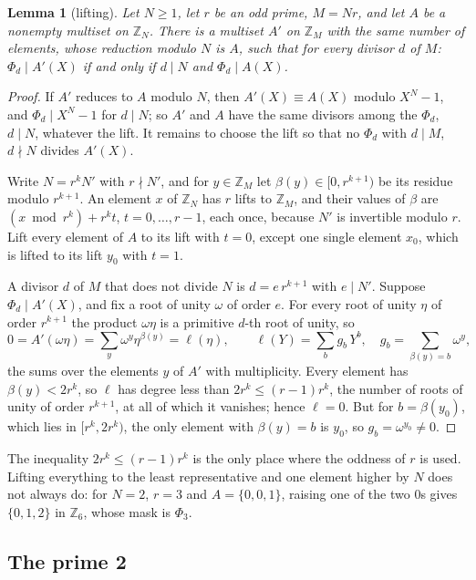 \documentclass[11pt,a4paper]{amsart}
\newtheorem{lemma}[theorem]{Lemma}
\theoremstyle{definition}
\theoremstyle{remark}
\newcommand{\Z}{\mathbb{Z}}
\begin{document}
\begin{lemma}[lifting]\label{lem:lift}
Let $N\ge1$, let $r$ be an odd prime, $M=Nr$, and let $A$ be a nonempty multiset on $\Z_N$. There is a
multiset $A'$ on $\Z_M$ with the same number of elements, whose reduction modulo $N$ is $A$, such that for
every divisor $d$ of $M$: $\Phi_d\mid A'(X)$ if and only if $d\mid N$ and $\Phi_d\mid A(X)$.
\end{lemma}
\begin{proof}
If $A'$ reduces to $A$ modulo $N$, then $A'(X)\equiv A(X)$ modulo $X^N-1$, and $\Phi_d\mid X^N-1$ for $d\mid N$; so
$A'$ and $A$ have the same divisors among the $\Phi_d$, $d\mid N$, whatever the lift. It remains to choose the
lift so that no $\Phi_d$ with $d\mid M$, $d\nmid N$ divides $A'(X)$.

Write $N=r^kN'$ with $r\nmid N'$, and for $y\in\Z_M$ let $\beta(y)\in[0,r^{k+1})$ be its residue modulo
$r^{k+1}$. An element $x$ of $\Z_N$ has $r$ lifts to $\Z_M$, and their values of $\beta$ are
$(x \bmod r^k)+r^kt$, $t=0,\dots,r-1$, each once, because $N'$ is invertible modulo $r$. Lift every element of
$A$ to its lift with $t=0$, except one single element $x_0$, which is lifted to its lift $y_0$ with $t=1$.

A divisor $d$ of $M$ that does not divide $N$ is $d=e\,r^{k+1}$ with $e\mid N'$. Suppose $\Phi_d\mid A'(X)$, and fix a root of
unity $\omega$ of order $e$. For every root of unity $\eta$ of order $r^{k+1}$ the product $\omega\eta$ is a
primitive $d$-th root of unity, so
\[
0=A'(\omega\eta)=\sum_{y}\omega^{y}\eta^{\beta(y)}=\ell(\eta),\qquad
\ell(Y)=\sum_{b}g_b\,Y^{b},\quad g_b=\sum_{\beta(y)=b}\omega^{y},
\]
the sums over the elements $y$ of $A'$ with multiplicity. Every element has $\beta(y)<2r^k$, so $\ell$ has
degree less than $2r^k\le(r-1)r^k$, the number of roots of unity of order $r^{k+1}$, at all of which it
vanishes; hence $\ell=0$. But for $b=\beta(y_0)$, which lies in $[r^k,2r^k)$, the only element with
$\beta(y)=b$ is $y_0$, so $g_b=\omega^{y_0}\ne0$.
\end{proof}

The inequality $2r^k\le(r-1)r^k$ is the only place where the oddness of $r$ is used. Lifting everything to the least
representative and one element higher by $N$ does not always do: for $N=2$, $r=3$ and $A=\{0,0,1\}$, raising one of the two $0$s gives $\{0,1,2\}$ in $\Z_6$,
whose mask is $\Phi_3$.

\subsection*{The prime 2}
\end{document}
